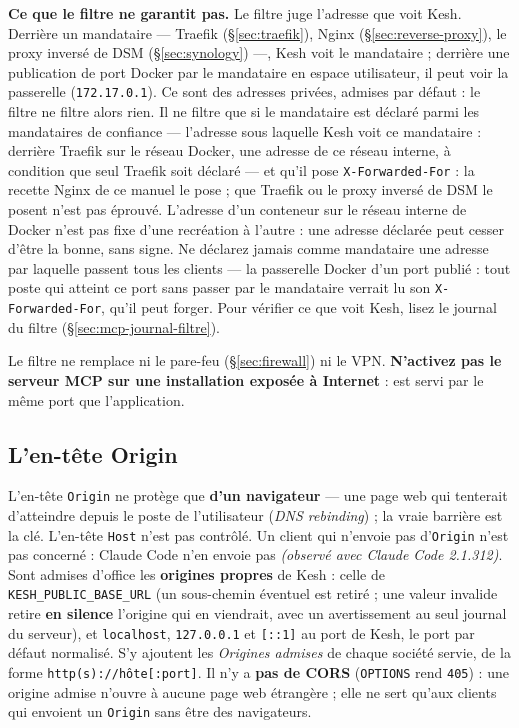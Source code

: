 \documentclass[a4paper,11pt,oneside]{article}
\begin{document}
\begin{keshwarning}
\textbf{Ce que le filtre ne garantit pas.} Le filtre juge l'adresse que voit Kesh. Derrière un mandataire --- Traefik (\S\ref{sec:traefik}), Nginx (\S\ref{sec:reverse-proxy}), le proxy inversé de DSM (\S\ref{sec:synology}) ---, Kesh voit le mandataire ; derrière une publication de port Docker par le mandataire en espace utilisateur, il peut voir la passerelle (\texttt{172.17.0.1}). Ce sont des adresses privées, admises par défaut : le filtre ne filtre alors rien. Il ne filtre que si le mandataire est déclaré parmi les mandataires de confiance --- l'adresse sous laquelle Kesh voit ce mandataire : derrière Traefik sur le réseau Docker, une adresse de ce réseau interne, à condition que seul Traefik soit déclaré --- et qu'il pose \texttt{X-Forwarded-For} : la recette Nginx de ce manuel le pose ; que Traefik ou le proxy inversé de DSM le posent n'est pas éprouvé. L'adresse d'un conteneur sur le réseau interne de Docker n'est pas fixe d'une recréation à l'autre : une adresse déclarée peut cesser d'être la bonne, sans signe. Ne déclarez jamais comme mandataire une adresse par laquelle passent tous les clients --- la passerelle Docker d'un port publié : tout poste qui atteint ce port sans passer par le mandataire verrait lu son \texttt{X-Forwarded-For}, qu'il peut forger. Pour vérifier ce que voit Kesh, lisez le journal du filtre (\S\ref{sec:mcp-journal-filtre}).

Le filtre ne remplace ni le pare-feu (\S\ref{sec:firewall}) ni le VPN. \textbf{N'activez pas le serveur MCP sur une installation exposée à Internet} :  est servi par le même port que l'application.
\end{keshwarning}

\subsection{L'en-tête Origin}\label{sec:mcp-origin}

L'en-tête \texttt{Origin} ne protège que \textbf{d'un navigateur} --- une page web qui tenterait d'atteindre  depuis le poste de l'utilisateur (\emph{DNS rebinding}) ; la vraie barrière est la clé. L'en-tête \texttt{Host} n'est pas contrôlé. Un client qui n'envoie pas d'\texttt{Origin} n'est pas concerné : Claude Code n'en envoie pas \emph{(observé avec Claude Code 2.1.312)}. Sont admises d'office les \textbf{origines propres} de Kesh : celle de \texttt{KESH\_PUBLIC\_BASE\_URL} (un sous-chemin éventuel est retiré ; une valeur invalide retire \textbf{en silence} l'origine qui en viendrait, avec un avertissement au seul journal du serveur), et \texttt{localhost}, \texttt{127.0.0.1} et \texttt{[::1]} au port de Kesh, le port par défaut normalisé. S'y ajoutent les \emph{Origines admises} de chaque société servie, de la forme \texttt{http(s)://hôte[:port]}. Il n'y a \textbf{pas de CORS} (\texttt{OPTIONS} rend \texttt{405}) : une origine admise n'ouvre  à aucune page web étrangère ; elle ne sert qu'aux clients qui envoient un \texttt{Origin} sans être des navigateurs.
\end{document}
